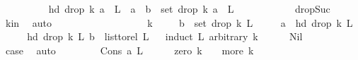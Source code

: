 \begin{isabellebody}
\ \ \ \ \ \ \ \ \isamarkupfalse%
\ {\isachardoublequoteopen}hd\ {\isacharparenleft}{\kern0pt}drop\ {\isacharquery}{\kern0pt}k\ {\isacharparenleft}{\kern0pt}a{}\ {\isacharhash}{\kern0pt}\ L{\isacharparenright}{\kern0pt}{\isacharparenright}{\kern0pt}\ {\isacharequal}{\kern0pt}\ a\ {\isasymand}\ b\ {\isasymin}\ set\ {\isacharparenleft}{\kern0pt}drop\ {\isacharquery}{\kern0pt}k\ {\isacharparenleft}{\kern0pt}a{}\ {\isacharhash}{\kern0pt}\ L{\isacharparenright}{\kern0pt}{\isacharparenright}{\kern0pt}{\isachardoublequoteclose}\isanewline
\ \ \ \ \ \ \ \ \ \ \isamarkupfalse%
\ drop{\isacharunderscore}{\kern0pt}Suc\ \isamarkupfalse%
\ k{\isacharunderscore}{\kern0pt}in\ \isamarkupfalse%
\ auto\ \isanewline
\ \ \ \ \ \ \isamarkupfalse%
\isanewline
\ \ \ \ \isamarkupfalse%
\isanewline
\ \ \isamarkupfalse%
\isanewline
{}\isamarkupfalse%
\isanewline
\ \ \isamarkupfalse%
\ k\ \isanewline
\ \ \isamarkupfalse%
\ {\isachardoublequoteopen}b\ {\isasymin}\ set\ {\isacharparenleft}{\kern0pt}drop\ k\ L{\isacharparenright}{\kern0pt}{\isachardoublequoteclose}\isanewline
\ \ \ \ \ {\isachardoublequoteopen}a\ {\isacharequal}{\kern0pt}\ hd\ {\isacharparenleft}{\kern0pt}drop\ k\ L{\isacharparenright}{\kern0pt}{\isachardoublequoteclose}\isanewline
\ \ \isamarkupfalse%
\ \isamarkupfalse%
\ {\isachardoublequoteopen}{\isacharparenleft}{\kern0pt}hd\ {\isacharparenleft}{\kern0pt}drop\ k\ L{\isacharparenright}{\kern0pt}{\isacharcomma}{\kern0pt}\ b{\isacharparenright}{\kern0pt}\ {\isasymin}\ list{\isacharunderscore}{\kern0pt}to{\isacharunderscore}{\kern0pt}rel\ L{\isachardoublequoteclose}\isanewline
\ \ \isamarkupfalse%
{\isacharparenleft}{\kern0pt}induct\ L\ arbitrary{\isacharcolon}{\kern0pt}\ k{\isacharparenright}{\kern0pt}\isanewline
\ \ \ \ \isamarkupfalse%
\ Nil\isanewline
\ \ \ \ \isamarkupfalse%
\ \isamarkupfalse%
\ {\isacharquery}{\kern0pt}case\ \isamarkupfalse%
\ auto\isanewline
\ \ \isamarkupfalse%
\isanewline
\ \ \ \ \isamarkupfalse%
\ {\isacharparenleft}{\kern0pt}Cons\ a\ L{\isacharparenright}{\kern0pt}\isanewline
\ \ \ \ \isamarkupfalse%
\ {\isacharparenleft}{\kern0pt}zero{\isacharparenright}{\kern0pt}\ {\isachardoublequoteopen}k\ {\isacharequal}{\kern0pt}\ {}{\isachardoublequoteclose}\ {\isacharbar}{\kern0pt}\ {\isacharparenleft}{\kern0pt}more{\isacharparenright}{\kern0pt}\ {\isachardoublequoteopen}k\ {\isachargreater}{\kern0pt}\ {}{\isachardoublequoteclose}\ \isamarkupfalse%

\end{isabellebody}
